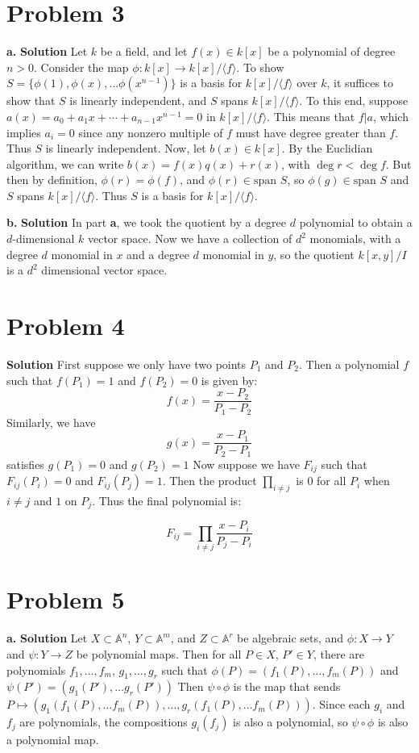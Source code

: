 \documentclass{article}
\newcommand{\Aff}{\mathbb{A}}
\begin{document}
\section{Problem 3}
\textbf{a. } \textbf{Solution } Let $k$ be a field, and let $f(x) \in k[x]$ be a polynomial of degree $n > 0$. Consider the map $\phi : k[x] \to k[x] / \langle f \rangle$. To show
$S = \{\phi(1), \phi(x), \ldots \phi(x^{n-1})\}$ is a basis for $k[x] / \langle f \rangle$ over $k$, it suffices to show that $S$ is linearly independent, and $S$ spans $k[x] / \langle f \rangle$.
To this end, suppose $a(x) = a_0 + a_1x + \cdots + a_{n-1}x^{n-1} = 0$ in $k[x] / \langle f \rangle$. This means that $f | a$, which implies $a_i = 0$ since any nonzero multiple of $f$ must have 
degree greater than $f$. Thus $S$ is linearly independent. Now, let $b(x) \in k[x]$. By the Euclidian algorithm, we can write $b(x) = f(x)q(x) + r(x)$, with $\deg r  < \deg f$. But then 
by definition, $\phi(r) = \phi(f)$, and $\phi(r) \in \text{span } S$, so $\phi(g) \in \text{span } S$ and $S$ spans $k[x] / \langle f \rangle$. Thus $S$ is a basis for $k[x] / \langle f \rangle$.

\textbf{b. } \textbf{Solution } In part \textbf{a}, we took the quotient by a degree $d$ polynomial to obtain a $d$-dimensional $k$ vector space. Now we have a collection of $d^2$ monomials,
with a degree $d$ monomial in $x$ and a degree $d$ monomial in $y$, so the quotient $k[x,y] / I$ is a $d^2$ dimensional vector space.

\section{Problem 4}
\textbf{Solution } First suppose we only have two points $P_1$ and $P_2$. Then a polynomial $f$ such that $f(P_1)=1 $ and $f(P_2)=0$ is given by:
\[ f(x) = \frac{x - P_2}{P_1 - P_2} \] Similarly, we have 
\[  g(x) = \frac{x - P_1}{P_2 - P_1}\] satisfies $g(P_1) = 0$ and $g(P_2) = 1$ Now suppose we have $F_{ij}$ such that $F_{ij}(P_i) = 0$ and $F_{ij}(P_j) = 1$. 
Then the product $\prod_{i \neq j}$ is $0$ for all $P_i$ when $i \neq j$ and $1$ on $P_j$. Thus the final polynomial is:

\[ F_{ij} = \prod_{i \neq j} \frac{x - P_i}{P_j - P_i} \]

\section{Problem 5} \textbf{a. } \textbf{Solution }Let $X \subset \Aff^n$, $Y \subset \Aff^m$, and $Z \subset \Aff^r$ be algebraic sets, and $\phi : X \to Y$ and $\psi : Y \to Z$ be polynomial maps.  
Then for all $P \in X $, $P' \in Y$, there are polynomials $f_1, \ldots, f_m$, $g_1 ,\ldots , g_r$ such that $\phi(P) = (f_1(P), \ldots, f_m(P))$ and $\psi(P') = (g_1(P'), \ldots g_r(P'))$
Then $\psi \circ \phi$ is the map that sends $P \mapsto (g_1(f_1(P), \ldots f_m(P)), \ldots, g_r(f_1(P), \ldots f_m(P)))$. Since each $g_i$ and $f_j$ are polynomials, the compositions
$g_i (f_j )$ is also a polynomial, so $\psi \circ \phi$ is also a polynomial map.
\end{document}
